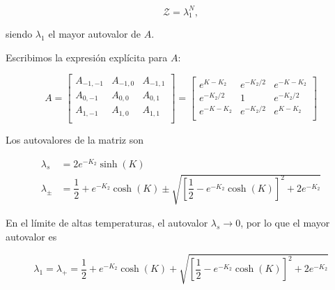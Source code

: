 \documentclass[10pt]{article}
\begin{document}
\begin{equation}
\mathcal{Z} = \lambda_1^N,
\end{equation}

siendo $\lambda_1$ el mayor autovalor de $A$.

Escribimos la expresi\'on expl\'icita para $A$:

\begin{equation}
A =
\begin{bmatrix}
A_{-1,-1} & A_{-1,0} & A_{-1,1} \\
A_{0,-1} & A_{0,0} & A_{0,1} \\
A_{1,-1} & A_{1,0} & A_{1,1} \\
\end{bmatrix}
= 
\begin{bmatrix}
e^{K-K_2} & e^{-K_2/2} & e^{-K-K_2} \\
e^{-K_2/2} & 1 & e^{-K_2/2} \\
e^{-K-K_2} & e^{-K_2/2} & e^{K-K_2} \\
\end{bmatrix}
\end{equation}

Los autovalores de la matriz son


\begin{align}
\lambda_s &= 2e^{-K_2}\sinh(K) \\
\lambda_{\pm} &= \dfrac{1}{2} + e^{-K_2} \cosh(K)\pm\sqrt{\left[ \dfrac{1}{2} - e^{-K_2} \cosh(K)  \right]^2 + 2e^{-K_2}}
\end{align}

En el l\'imite de altas temperaturas, el autovalor $\lambda_s \rightarrow 0$, por lo que el mayor autovalor es 

\begin{equation}
\lambda_1 = \lambda_+ = \dfrac{1}{2} + e^{-K_2} \cosh(K) + \sqrt{\left[ \dfrac{1}{2} - e^{-K_2} \cosh(K)  \right]^2 + 2e^{-K_2}}
\end{equation}
\end{document}
